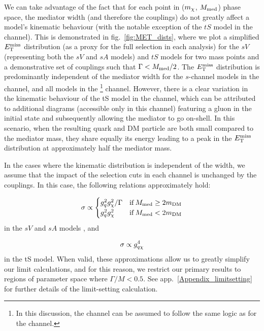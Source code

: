We can take advantage of the fact that for each point in ($m_{\chi}$, $M_{\mathrm{med}}$) phase space, the mediator width (and therefore the couplings) do not greatly affect a model's kinematic behaviour (with the notable exception of the $tS$ model in the \monojet channel). This is demonstrated in fig.~\ref{fig:MET_dists}, where we plot a simplified $E_{\mathrm{T}}^{\mathrm{miss}}$ distribution (as a proxy for the full selection in each analysis) for the $sV$ (representing both the $sV$ and $sA$ models) and $tS$ models for two mass points and a demonstrative set of couplings such that $\Gamma < M_{\mathrm{med}}/2$. The $E_{\mathrm{T}}^{\mathrm{miss}}$ distribution is predominantly independent of the mediator width for the $s$-channel models in the \monojet channel, and all models in the \monoZ\footnote{In this discussion, the \monoWZ channel can be assumed to follow the same logic as for the \monoZ channel.} channel. However, there is a clear variation in the kinematic behaviour of the tS model in the \monojet channel, which can be attributed to additional diagrams (accessible only in this channel) featuring a gluon in the initial state and subsequently allowing the mediator to go on-shell. In this scenario, when the resulting quark and DM particle are both small compared to the mediator mass, they share equally its energy leading to a peak in the $E_{\mathrm{T}}^{\mathrm{miss}}$ distribution at approximately half the mediator mass.

In the cases where the kinematic distribution is independent of the width, we assume that the impact of the selection cuts in each channel is unchanged by the couplings. In this case, the following relations approximately hold:

\begin{equation}
  \sigma \propto
  \begin{cases}
      g_q^2 g_{\chi}^2 / \Gamma & \mathrm{ if } \, M_{\mathrm{med}} \geq 2 m_{\mathrm{DM}}\\
      g_q^2 g_{\chi}^2 & \mathrm{ if } \, M_{\mathrm{med}} < 2 m_{\mathrm{DM}}
  \end{cases}
  \label{eq:sigma_propto_couplings_schan}
\end{equation}
in the $sV$ and $sA$ models  \cite{NordstromSVD}, and

\begin{equation}
  \sigma \propto g_{q \chi}^4
  \label{eq:sigma_propto_couplings_tchan}
\end{equation}
in the tS model. When valid, these approximations allow us to greatly simplify our limit calculations, and for this reason, we restrict our primary results to regions of parameter space where $\Gamma/M < 0.5$. See app.~\ref{Appendix_limitsetting} for further details of the limit-setting calculation.


